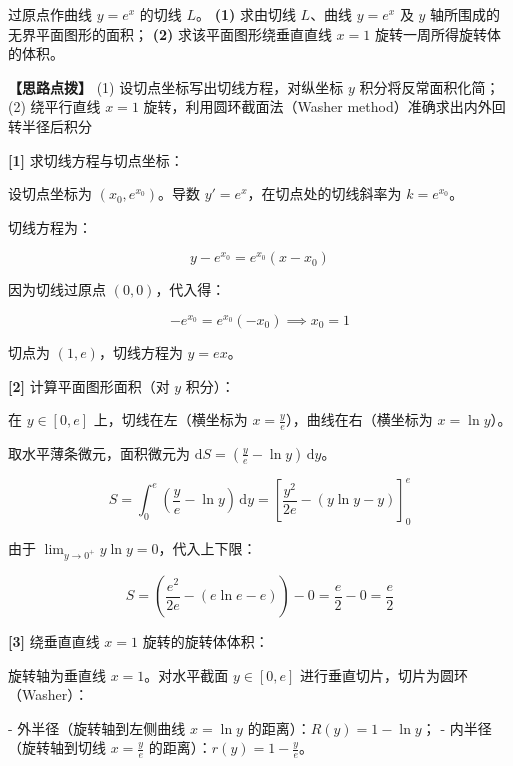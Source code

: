 \documentclass[11pt,a4paper,UTF8]{ctexart}
\begin{document}
过原点作曲线 $y = e^x$ 的切线 $L$。
\textbf{(1)}  求由切线 $L$、曲线 $y = e^x$ 及 $y$ 轴所围成的无界平面图形的面积；
\textbf{(2)}  求该平面图形绕垂直直线 $x = 1$ 旋转一周所得旋转体的体积。

\textbf{\color{DeepPurple}【思路点拨】} (1) 设切点坐标写出切线方程，对纵坐标 $y$ 积分将反常面积化简；(2) 绕平行直线 $x = 1$ 旋转，利用圆环截面法（Washer method）准确求出内外回转半径后积分


\begin{solbox}[分步推导与答题规范]
\textbf{[1]} 求切线方程与切点坐标：

设切点坐标为 $(x_0, e^{x_0})$。导数 $y' = e^x$，在切点处的切线斜率为 $k = e^{x_0}$。

切线方程为：


\begin{equation*}
y - e^{x_0} = e^{x_0}(x - x_0)
\end{equation*}


因为切线过原点 $(0, 0)$，代入得：


\begin{equation*}
-e^{x_0} = e^{x_0}(-x_0) \implies x_0 = 1
\end{equation*}


切点为 $(1, e)$，切线方程为 $y = ex$。

\textbf{[2]} 计算平面图形面积（对 $y$ 积分）：

在 $y \in [0, e]$ 上，切线在左（横坐标为 $x = \frac{y}{e}$），曲线在右（横坐标为 $x = \ln y$）。

取水平薄条微元，面积微元为 $\mathrm{d}S = \left(\frac{y}{e} - \ln y\right)\,\mathrm{d}y$。


\begin{equation*}
S = \int_0^e \left(\frac{y}{e} - \ln y\right)\,\mathrm{d}y = \left[\frac{y^2}{2e} - (y\ln y - y)\right]_0^e
\end{equation*}


由于 $\lim_{y \to 0^+} y\ln y = 0$，代入上下限：


\begin{equation*}
S = \left(\frac{e^2}{2e} - (e\ln e - e)\right) - 0 = \frac{e}{2} - 0 = \frac{e}{2}
\end{equation*}


\textbf{[3]} 绕垂直直线 $x = 1$ 旋转的旋转体体积：

旋转轴为垂直线 $x = 1$。对水平截面 $y \in [0, e]$ 进行垂直切片，切片为圆环（Washer）：

- 外半径（旋转轴到左侧曲线 $x = \ln y$ 的距离）：$R(y) = 1 - \ln y$；
- 内半径（旋转轴到切线 $x = \frac{y}{e}$ 的距离）：$r(y) = 1 - \frac{y}{e}$。


\end{solbox}
\end{document}
